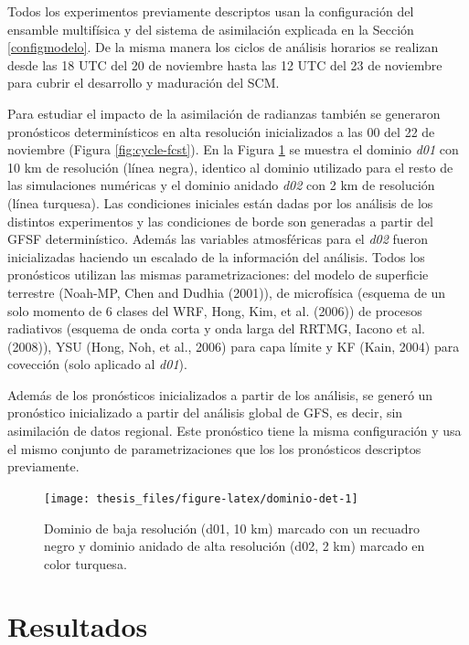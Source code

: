 \documentclass[12pt,oneside,a4paper]{reedthesis}
\begin{document}
Todos los experimentos previamente descriptos usan la configuración del ensamble multifísica y del sistema de asimilación explicada en la Sección \ref{configmodelo}. De la misma manera los ciclos de análisis horarios se realizan desde las 18 UTC del 20 de noviembre hasta las 12 UTC del 23 de noviembre para cubrir el desarrollo y maduración del SCM.

Para estudiar el impacto de la asimilación de radianzas también se generaron pronósticos determinísticos en alta resolución inicializados a las 00 del 22 de noviembre (Figura \ref{fig:cycle-fcst}). En la Figura \ref{fig:dominio-det} se muestra el dominio \emph{d01} con 10 km de resolución (línea negra), identico al dominio utilizado para el resto de las simulaciones numéricas y el dominio anidado \emph{d02} con 2 km de resolución (línea turquesa). Las condiciones iniciales están dadas por los análisis de los distintos experimentos y las condiciones de borde son generadas a partir del GFSF determinístico. Además las variables atmosféricas para el \emph{d02} fueron inicializadas haciendo un escalado de la información del análisis. Todos los pronósticos utilizan las mismas parametrizaciones: del modelo de superficie terrestre (Noah-MP, Chen and Dudhia (2001)), de microfísica (esquema de un solo momento de 6 clases del WRF, Hong, Kim, et al. (2006)) de procesos radiativos (esquema de onda corta y onda larga del RRTMG, Iacono et al. (2008)), YSU (Hong, Noh, et al., 2006) para capa límite y KF (Kain, 2004) para covección (solo aplicado al \emph{d01}).

Además de los pronósticos inicializados a partir de los análisis, se generó un pronóstico inicializado a partir del análisis global de GFS, es decir, sin asimilación de datos regional. Este pronóstico tiene la misma configuración y usa el mismo conjunto de parametrizaciones que los los pronósticos descriptos previamente.


\begin{figure}

{\centering \texttt{[image: thesis\_files/figure-latex/dominio-det-1]} 

}

\caption{Dominio de baja resolución (d01, 10 km) marcado con un recuadro negro y dominio anidado de alta resolución (d02, 2 km) marcado en color turquesa.}\label{fig:dominio-det}
\end{figure}
\hypertarget{resultados-2}{%
\section{Resultados}\label{resultados-2}}
\end{document}

